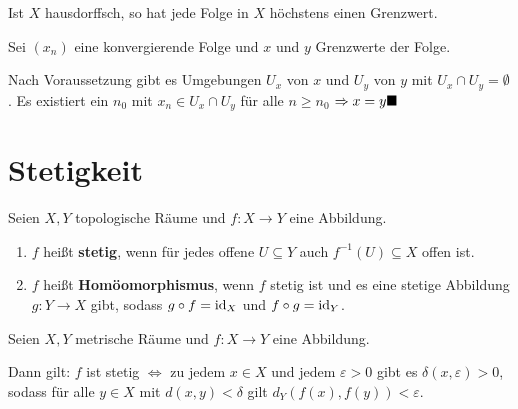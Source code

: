 \begin{korollar}
    Ist $X$ hausdorffsch, so hat jede Folge in $X$ höchstens einen
    Grenzwert.
\end{korollar}

\begin{beweis}
    Sei $(x_n)$ eine konvergierende Folge und $x$ und $y$ Grenzwerte der Folge.

    Nach Voraussetzung gibt es Umgebungen $U_x$ von $x$ und $U_y$
    von $y$ mit $U_x \cap U_y = \emptyset$. Es existiert ein
    $n_0$ mit $x_n \in U_x \cap U_y$ für alle $n \geq n_0$
    $\Rightarrow x = y \qed$
\end{beweis}

\section{Stetigkeit}
\begin{definition}
    Seien $X, Y$ topologische Räume und $f:X \rightarrow Y$ eine Abbildung.

    \begin{enumerate}[label=\alph*),ref=\theplaindefinition.\alph*]
        \item $f$ heißt \textbf{stetig}, wenn für jedes offene 
              $U \subseteq Y$ auch $f^{-1} (U) \subseteq X$ offen ist. \label{def:stetigkeit}
        \item $f$ heißt \textbf{Homöomorphismus}, wenn $f$ stetig ist
              und es eine 
              stetige Abbildung  $g: Y \rightarrow X$ gibt, sodass
              $g \circ f = \textnormal{id}_X$ und $f \circ g = \textnormal{id}_Y$.
    \end{enumerate}
\end{definition}

\begingroup
\renewcommand{\thmfoot}{\footnotemark}
\begin{korollar}
  Seien $X, Y$ metrische Räume und $f\colon X \rightarrow Y$ eine
  Abbildung.

  Dann gilt: $f$ ist stetig $\Leftrightarrow$ zu jedem $x \in X$ und
  jedem $\varepsilon > 0$ gibt es $\delta(x, \varepsilon) > 0$, sodass
  für alle $y \in X$ mit $d(x,y) < \delta $ gilt $d_Y(f(x), f(y)) <
  \varepsilon$.
\end{korollar}
\endgroup

